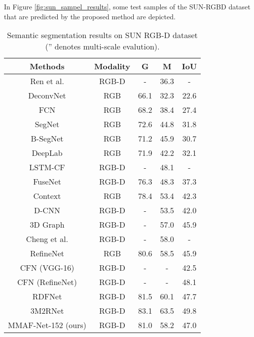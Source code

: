 \documentclass[journal,transmag]{IEEEtran}
\begin{document}
In Figure \ref{fig:sun_sampel_results}, some test samples of the SUN-RGBD dataset that are predicted by the proposed method are depicted. 
\begin{table}
	\caption{Semantic segmentation results on SUN RGB-D dataset ('' denotes multi-scale evalution).}
	\label{tab:2}
	\begin{tabular}{|c|c|c|c|c|}
		\hline
		Methods	&Modality&	G &	M&	IoU \\
		\hline
		Ren et al. \cite{ren2012rgb}&RGB-D&	-&	36.3&	-\\
		\hline
		DeconvNet \cite{noh2015learning}&	RGB	&66.1&	32.3&	22.6\\
		\hline
		FCN  \cite{long2015fully}	& RGB &	68.2&	38.4&	27.4\\
		\hline
		SegNet \cite{badrinarayanan2017segnet_jo}&	RGB &	72.6&	44.8&	31.8\\
		\hline
		B-SegNet \cite{kendall2015bayesian}&	RGB &	71.2&	45.9&	30.7\\
		\hline
		DeepLab \cite{chen2018deeplab_j}&RGB	 &71.9 &	42.2 &	32.1 \\
		\hline
		LSTM-CF \cite{li2016lstm}&	RGB-D &	-&	48.1 &	-\\
		\hline
		FuseNet \cite{hazirbas2016fusenet}&	RGB-D	&76.3&	48.3&	37.3\\
		\hline
		Context \cite{lin2018exploring}&	RGB	&78.4&	53.4&	42.3 \\
		\hline
		D-CNN \cite{wang2018depth} &	RGB-D&	-&	53.5&	42.0\\
		\hline
		3D Graph \cite{qi20173d} & RGB-D & - & 57.0 & 45.9  \\
		\hline
		Cheng et al. \cite{cheng2017localitysensitive} & RGB-D & -& 58.0 & -  \\ 
		\hline
		RefineNet \cite{lin2017refinenet} &RGB&	80.6&	58.5&	45.9\\
		\hline
		CFN (VGG-16)\cite{lin2017cascaded} & RGB-D & - & - & 42.5 \\
		\hline
		CFN (RefineNet)\cite{lin2017cascaded} & RGB-D & - & - & 48.1 \\
		\hline
		RDFNet \cite{park2017rdfnet}& 	RGB-D&	81.5&	60.1&	47.7\\
		\hline
		3M2RNet \cite{fooladgar20193m2rnet}& 	RGB-D&	83.1&	63.5&	49.8\\
		\hline
		MMAF-Net-152 (ours) & 	RGB-D&81.0	&58.2	&47.0	\\
		\hline			
	\end{tabular}
\end{table}
\end{document}
